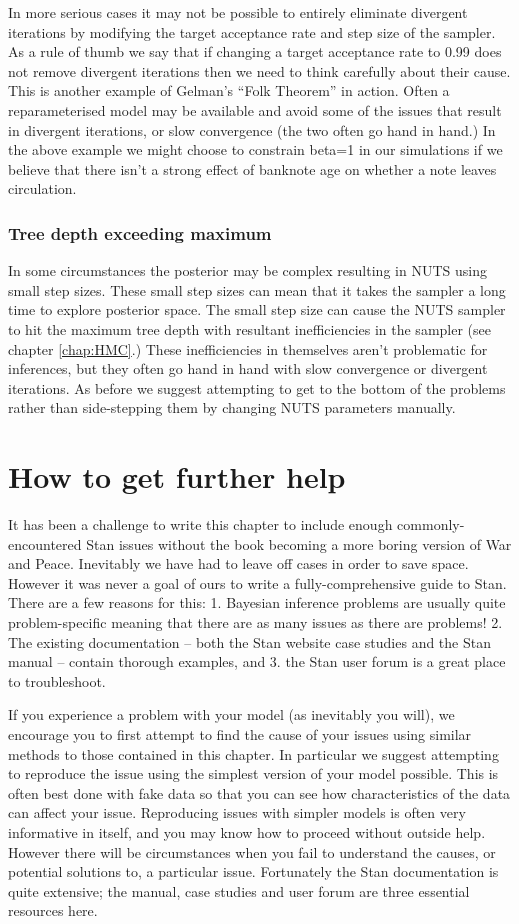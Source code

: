 \documentclass[11pt,fullpage]{book}
\begin{document}
In more serious cases it may not be possible to entirely eliminate divergent iterations by modifying the target acceptance rate and step size of the sampler. As a rule of thumb we say that if changing a target acceptance rate to 0.99 does not remove divergent iterations then we need to think carefully about their cause. This is another example of Gelman's ``Folk Theorem'' in action. Often a reparameterised model may be available and avoid some of the issues that result in divergent iterations, or slow convergence (the two often go hand in hand.) In the above example we might choose to constrain beta=1 in our simulations if we believe that there isn't a strong effect of banknote age on whether a note leaves circulation. 

\subsubsection{Tree depth exceeding maximum}
In some circumstances the posterior may be complex resulting in NUTS using small step sizes. These small step sizes can mean that it takes the sampler a long time to explore posterior space. The small step size can cause the NUTS sampler to hit the maximum tree depth with resultant inefficiencies in the sampler (see chapter \ref{chap:HMC}.) These inefficiencies in themselves aren't problematic for inferences, but they often go hand in hand with slow convergence or divergent iterations. As before we suggest attempting to get to the bottom of the problems rather than side-stepping them by changing NUTS parameters manually. 

\section{How to get further help}
It has been a challenge to write this chapter to include enough commonly-encountered Stan issues without the book becoming a more boring version of War and Peace. Inevitably we have had to leave off cases in order to save space. However it was never a goal of ours to write a fully-comprehensive guide to Stan. There are a few reasons for this: 1. Bayesian inference problems are usually quite problem-specific meaning that there are as many issues as there are problems! 2. The existing documentation -- both the Stan website case studies and the Stan manual -- contain thorough examples, and 3. the Stan user forum is a great place to troubleshoot.

If you experience a problem with your model (as inevitably you will), we encourage you to first attempt to find the cause of your issues using similar methods to those contained in this chapter. In particular we suggest attempting to reproduce the issue using the simplest version of your model possible. This is often best done with fake data so that you can see how characteristics of the data can affect your issue. Reproducing issues with simpler models is often very informative in itself, and you may know how to proceed without outside help. However there will be circumstances when you fail to understand the causes, or potential solutions to, a particular issue. Fortunately the Stan documentation is quite extensive; the manual, case studies and user forum are three essential resources here.
\end{document}

